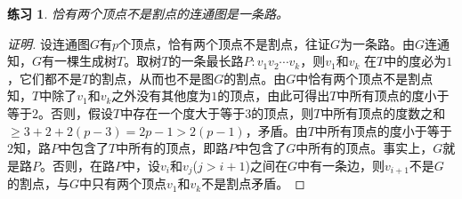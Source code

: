 \documentclass{article}
\newtheorem{Exercise}{练习}
\begin{document}
\begin{CJK*}{UTF8}{gbsn}
  \begin{Exercise}
    恰有两个顶点不是割点的连通图是一条路。
  \end{Exercise}
  \begin{proof}[证明]设连通图$G$有$p$个顶点，恰有两个顶点不是割点，往证$G$为一条路。由$G$连通知，$G$有一棵生成树$T$。取树$T$的一条最长路$P:v_1v_2\cdots v_k$，则$v_1$和$v_k$ 在$T$中的度必为$1$，它们都不是$T$的割点，从而也不是图$G$的割点。由$G$中恰有两个顶点不是割点知，$T$中除了$v_1$和$v_k$之外没有其他度为$1$的顶点，由此可得出$T$中所有顶点的度小于等于$2$。否则，假设$T$中存在一个度大于等于$3$的顶点，则$T$中所有顶点的度数之和$\geq 3 + 2 + 2(p-3) = 2p -1 > 2(p-1)$，矛盾。由$T$中所有顶点的度小于等于$2$知，路$P$中包含了$T$中所有的顶点，即路$P$中包含了$G$中所有的顶点。事实上，$G$就是路$P$。否则，在路$P$中，设$v_i$和$v_j$($j>i+1$)之间在$G$中有一条边，则$v_{i+1}$不是$G$的割点，与$G$中只有两个顶点$v_1$和$v_k$不是割点矛盾。
  \end{proof}

\chapter{}

\end{CJK*}
\end{document}
